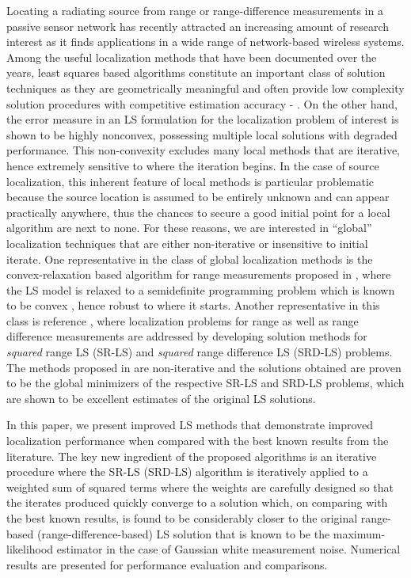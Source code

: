 \label{chapter:irw}

Locating a radiating source from range or range-difference measurements in a passive sensor network has recently attracted an increasing amount of research interest as it finds applications in a wide range of network-based wireless systems. Among the useful localization methods that have been documented over the years, least squares based algorithms constitute an important class of solution techniques as they are geometrically meaningful and often provide low complexity solution procedures with competitive estimation accuracy \cite{SmithAbel} - \cite{BeckStLi}. On the other hand, the error measure in an LS formulation for the localization problem of interest is shown to be highly nonconvex, possessing multiple local solutions with degraded performance. This non-convexity excludes many local methods that are iterative, hence extremely sensitive to where the iteration begins. In the case of source localization, this inherent feature of local methods is particular problematic because the source location is assumed to be entirely unknown and can appear practically anywhere, thus the chances to secure a good initial point for a local algorithm are next to none. For these reasons, we are interested in ``global'' localization techniques that are either non-iterative or insensitive to initial iterate. One representative in the class of global localization methods is the convex-relaxation based algorithm for range measurements proposed in \cite{Cheung}, where the LS model is relaxed to a semidefinite programming problem which is known to be convex \cite{VBoyd}, hence robust to where it starts. Another representative in this class is reference \cite{BeckStLi}, where localization problems for  range as well as range difference measurements are addressed by developing solution methods for \textit{squared} range LS (SR-LS) and \textit{squared} range difference LS (SRD-LS) problems. The methods proposed in \cite{BeckStLi} are non-iterative and the solutions obtained are proven to be the global minimizers of the respective SR-LS and SRD-LS problems, which are shown to be excellent estimates of the original LS solutions.

In this paper, we present improved LS methods that demonstrate improved localization performance when compared with the best known results from the literature. The key new ingredient of the proposed algorithms is an iterative procedure where the SR-LS (SRD-LS) algorithm is iteratively applied to a weighted sum of squared terms where the weights are carefully designed so that the iterates produced quickly converge to a solution which, on comparing with the best known results, is found to be considerably closer to the original range-based (range-difference-based) LS solution that is known to be the maximum-likelihood estimator in the case of Gaussian white measurement noise. Numerical results are presented for performance evaluation and comparisons.



